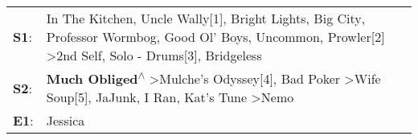 \begin{supertabular}{p{0.03\textwidth}p{0.92\textwidth}}
 \textbf{S1}:  &  In The Kitchen\textsuperscript{}, \enspace Uncle Wally[1]\textsuperscript{}, \enspace Bright Lights, Big City\textsuperscript{}, \enspace Professor Wormbog\textsuperscript{}, \enspace Good Ol' Boys\textsuperscript{}, \enspace Uncommon\textsuperscript{}, \enspace Prowler[2]\textsuperscript{} \textgreater \enspace 2nd Self\textsuperscript{}, \enspace Solo - Drums[3]\textsuperscript{}, \enspace Bridgeless\textsuperscript{}  \enspace  \\
 \textbf{S2}:  &                                                                          \textbf{Much Obliged\textsuperscript{$\wedge$}} \textgreater \enspace Mulche's Odyssey[4]\textsuperscript{}, \enspace Bad Poker\textsuperscript{} \textgreater \enspace Wife Soup[5]\textsuperscript{}, \enspace JaJunk\textsuperscript{}, \enspace I Ran\textsuperscript{}, \enspace Kat's Tune\textsuperscript{} \textgreater \enspace Nemo\textsuperscript{}  \enspace  \\
 \textbf{E1}:  &                                                                                                                                                                                                                                                                                                                                                                                                                Jessica\textsuperscript{}  \enspace  \\
\end{supertabular}
